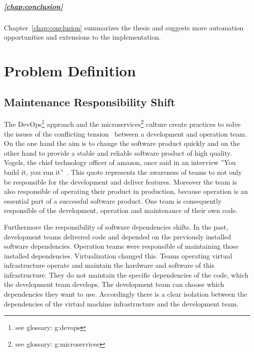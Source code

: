 \paragraph{\ref{chap:conclusion} }
Chapter~\ref{chap:conclusion} summarizes the thesis and suggests more automation
opportunities and extensions to the implementation.

\chapter{Problem Definition}
\label{chap:problem}

\section{Maintenance Responsibility Shift}

The DevOps\footnote{see glossary: \gls{g:devops}} approach and the
microservices\footnote{see glossary: \gls{g:microservices}} culture create practices to
solve the issues of the conflicting tension~\cite{sre_intro} between a development and
operation team. On the one hand the aim is to change the software product quickly and on
the other hand to provide a stable and reliable software product of high quality. Vogels,
the chief technology officer of amazon, once said in an interview ”You build it, you run
it”~\cite{build_run}. This quote represents the awareness of teams to not only be
responsible for the development and deliver features. Moreover the team is also
responsible of operating their product in production, because operation is an essential
part of a successful software product. One team is consequently responsible of the
development, operation and maintenance of their own code.

Furthermore the responsibility of software dependencies shifts. In the past, development
teams delivered code and depended on the previously installed software
dependencies. Operation teams were responsible of maintaining those installed
dependencies. Virtualization changed this. Teams operating virtual infrastructure operate
and maintain the hardware and software of this infrastructure. They do not maintain the
specific dependencies of the code, which the development team develops. The development
team can choose which dependencies they want to use. Accordingly there is a clear
isolation between the dependencies of the virtual machine infrastructure and the
development team.


